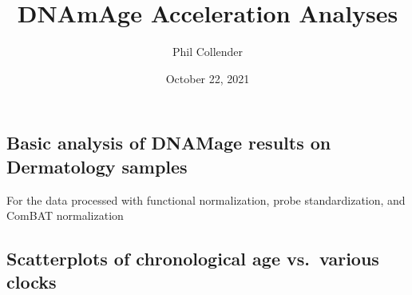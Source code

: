 \documentclass[]{article}
\title{DNAmAge Acceleration Analyses}
\author{Phil Collender}
\date{October 22, 2021}
\newenvironment{Shaded}{\begin{snugshade}}{\end{snugshade}}
\newcommand{\KeywordTok}[1]{\textcolor[rgb]{0.13,0.29,0.53}{\textbf{#1}}}
\newcommand{\DecValTok}[1]{\textcolor[rgb]{0.00,0.00,0.81}{#1}}
\newcommand{\StringTok}[1]{\textcolor[rgb]{0.31,0.60,0.02}{#1}}
\newcommand{\CommentTok}[1]{\textcolor[rgb]{0.56,0.35,0.01}{\textit{#1}}}
\newcommand{\OperatorTok}[1]{\textcolor[rgb]{0.81,0.36,0.00}{\textbf{#1}}}
\newcommand{\NormalTok}[1]{#1}
\begin{document}
\maketitle

\subsection{Basic analysis of DNAMage results on Dermatology
samples}\label{basic-analysis-of-dnamage-results-on-dermatology-samples}

For the data processed with functional normalization, probe
standardization, and ComBAT normalization

\begin{Shaded}
\end{Shaded}

\subsection{Scatterplots of chronological age vs.~various
clocks}\label{scatterplots-of-chronological-age-vs.various-clocks}
\end{document}
